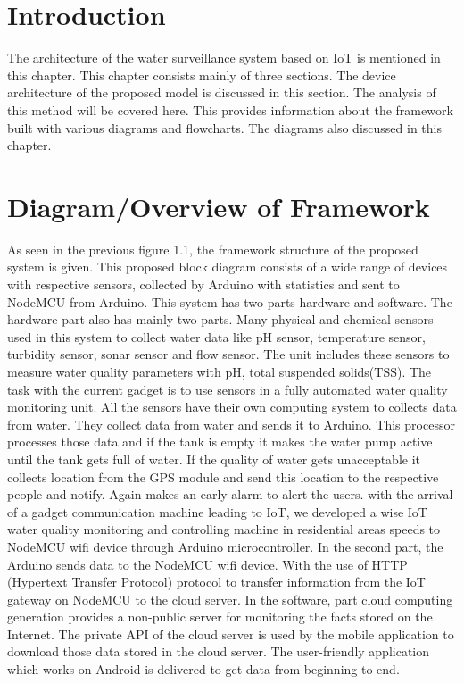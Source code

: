 \section{Introduction}
The architecture of the water surveillance system based on IoT is mentioned in this chapter.
This chapter consists mainly of three sections. The device architecture of the proposed model is discussed in this section. The analysis of this method will be covered here. This provides information about the framework built with various diagrams and flowcharts. The diagrams also discussed in this chapter.
\section{Diagram/Overview of Framework}
As seen in the previous figure 1.1, the framework structure of the proposed system is given. This proposed block diagram consists of a wide range of devices with respective sensors, collected by Arduino with statistics and sent to NodeMCU from Arduino. This system has two parts hardware and software. The hardware part also has mainly two parts. Many physical and chemical sensors used in this system to collect water data like pH sensor, temperature sensor, turbidity sensor, sonar sensor and flow sensor. The unit includes these sensors to measure water quality parameters with pH, total suspended solids(TSS). The task with the current gadget is to use sensors in a fully automated water quality monitoring unit. All the sensors have their own computing system to collects data from water. They collect data from water and sends it to Arduino. This processor processes those data and if the tank is empty it makes the water pump active until the tank gets full of water. If the quality of water gets unacceptable it collects location from the GPS module and send this location to the respective people and notify. Again makes an early alarm to alert the users. with the arrival of a gadget communication machine leading to IoT, we developed a wise IoT water quality monitoring and controlling machine in residential areas speeds to NodeMCU wifi device through Arduino microcontroller. In the second part, the Arduino sends data to the NodeMCU wifi device. With the use of HTTP (Hypertext Transfer Protocol) protocol to transfer information from the IoT gateway on NodeMCU to the cloud server. In the software, part cloud computing generation provides a non-public server for monitoring the facts stored on the Internet. The private API of the cloud server is used by the mobile application to download those data stored in the cloud server. The user-friendly application which works on Android is delivered to get data from beginning to end.

